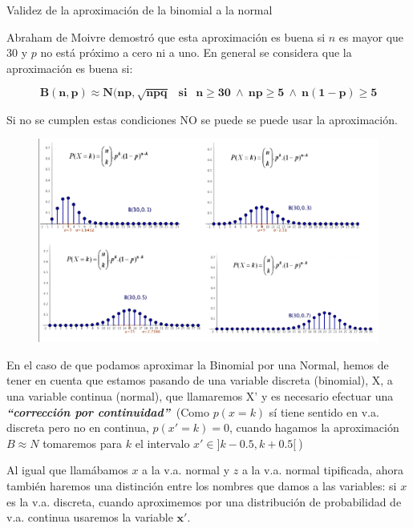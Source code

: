 \vspace{4mm} %
\begin{myalertblock}
	{Validez de la aproximación de la binomial a la normal}
	
Abraham de Moivre demostró que esta aproximación es buena si $n$ es mayor que $30$ y $p$ no está próximo a cero ni a uno. En general se considera que la aproximación es buena si:


$$\boldsymbol{
B(n,p) \approx N(np,\sqrt{npq} \ \ \text{ si } \ \ n	\ge 30 \ \wedge \  np \ge 5  \ \wedge \  n(1-p) \ge 5
}$$

Si no se cumplen estas condiciones NO se puede se puede usar la aproximación.
\end{myalertblock}

\begin{figure}[H]
	\centering
	\includegraphics[width=1\textwidth]{imagenes/imagenes04/T04IM39.png}
	\end{figure}

\vspace{4mm} %
\begin{destacado}

En el caso de que podamos aproximar la Binomial por una Normal, hemos de tener en cuenta que estamos pasando de una variable discreta (binomial), X, a una variable continua (normal), que llamaremos X' y es necesario efectuar una \textbf{\emph{``corrección por continuidad''}} \textcolor{gris}{$\ $(Como $p(x=k)$ sí tiene sentido en v.a. discreta pero no en continua, $p(x'=k)=0$, cuando hagamos la aproximación $B\approx N$ tomaremos para $k$ el intervalo $x'\in ]k-0.5,k+0.5[\ $)}

\end{destacado}

\vspace{4mm} %
Al igual que llamábamos $x$ a la v.a. normal y $z$ a la v.a. normal tipificada, ahora también haremos una distinción entre los nombres que damos a las variables: si $x$ es la v.a. discreta, cuando aproximemos por una distribución de probabilidad de v.a. continua usaremos la variable $\boldsymbol { x' } $.

